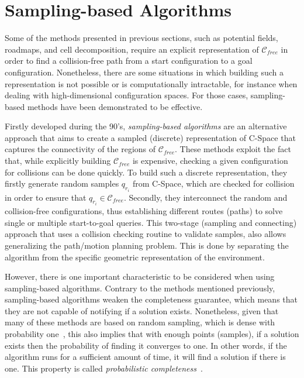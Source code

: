 
\section{Sampling-based Algorithms}
\label{sec:SamplingBasedAlg}

Some of the methods presented in previous sections, such as potential fields,
roadmaps, and cell decomposition, require an explicit representation of
$\mathcal{C}_{free}$ in order to find a collision-free path from a start
configuration to a goal configuration. Nonetheless, there are some situations in
which building such a representation is not possible or is computationally
intractable, for instance when dealing with high-dimensional configuration
spaces. For those cases, sampling-based methods have been demonstrated to be
effective.

Firstly developed during the 90's, \textit{sampling-based algorithms} are an
alternative approach that aims to create a sampled (discrete) representation of
\ac{C-Space} that captures the connectivity of the regions of
$\mathcal{C}_{free}$. These methods exploit the fact that, while explicitly
building $\mathcal{C}_{free}$ is expensive, checking a given configuration for
collisions can be done quickly. To build such a discrete representation, they
firstly generate random samples $q_{r_i}$ from \ac{C-Space}, which are checked
for collision in order to ensure that $q_{r_i} \in \mathcal{C}_{free}$.
Secondly, they interconnect the random and collision-free configurations, thus
establishing different routes (paths) to solve single or multiple start-to-goal
queries. This two-stage (sampling and connecting) approach that uses a collision
checking routine to validate samples, also allows generalizing the path/motion
planning problem. This is done by separating the algorithm from the specific
geometric representation of the environment.

However, there is one important characteristic to be considered when using
sampling-based algorithms. Contrary to the methods mentioned previously,
sampling-based algorithms weaken the completeness guarantee, which means that
they are not capable of notifying if a solution exists.
Nonetheless, given that many of these methods are based on random sampling,
which is dense with probability one~\cite{LaValle2006}, this also implies that
with enough points (samples), if a solution exists then the probability of
finding it converges to one.
In other words, if the algorithm runs for a sufficient amount of time, it will
find a solution if there is one. This property is called \textit{probabilistic
completeness}~\cite{Kavraki1996,Barraquand1997,Kavraki1998}.

